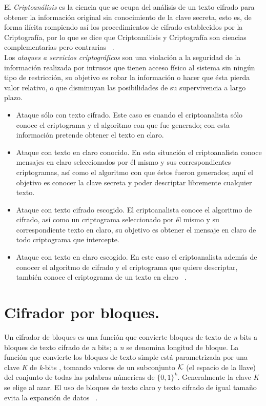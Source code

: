 El \textit{ Criptoanálisis } es la ciencia que se ocupa del análisis de un texto cifrado para obtener la información original sin conocimiento de la clave secreta, esto es, de forma ilícita rompiendo así los procedimientos de cifrado establecidos por la Criptografía, por lo que se dice que Criptoanálisis y Criptografía son ciencias complementarias pero contrarias ~\cite{cripto}. \\


Los \textit{ataques a servicios criptográficos } son una violación a la seguridad de la información realizada por intrusos que tienen acceso físico al sistema sin ningún tipo de restricción, su objetivo es robar la información o hacer que ésta pierda valor relativo, o que disminuyan las posibilidades de su supervivencia a largo plazo.\\
\begin{itemize}
\item Ataque sólo con texto cifrado. Este caso es cuando el criptoanalista sólo conoce el criptograma y el algoritmo con que fue generado; con esta información pretende obtener el texto en claro.
\item Ataque con texto en claro conocido. En esta situación el criptoanalista conoce mensajes en claro seleccionados por él mismo y sus correspondientes criptogramas, así como el algoritmo con que éstos fueron generados; aquí el objetivo es conocer la clave
secreta y poder descriptar libremente cualquier texto. 
\item Ataque con texto cifrado escogido. El criptoanalista conoce el algoritmo de cifrado, así como un criptograma seleccionado por él mismo y su correspondiente texto en claro, su objetivo es obtener el mensaje en claro de todo criptograma que intercepte.
\item Ataque con texto en claro escogido. En este caso el criptoanalista además de conocer el algoritmo de cifrado y el criptograma que quiere descriptar, también conoce el criptograma de un texto en claro ~\cite{ataques}.
\end{itemize} 

\section{Cifrador por bloques. }

Un cifrador de bloques es una función que convierte bloques de texto de \textit{n} bits a bloques de texto cifrado de \textit{n}  bits; a \textit{n}  se denomina longitud de bloque. La función que convierte los bloques de texto simple está parametrizada por una clave \textit{K} de \textit{ k}-bits , tomando valores de un subconjunto $\cal{K}$ (el espacio de la llave) del conjunto de todas las palabras númericas de \textit{$ \{ 0,1 \} ^{k}$}. Generalmente la clave \textit{K} se elige al azar. El uso de bloques de texto claro y texto cifrado de igual tamaño evita la expansión de datos ~\cite{menezes}. \\

